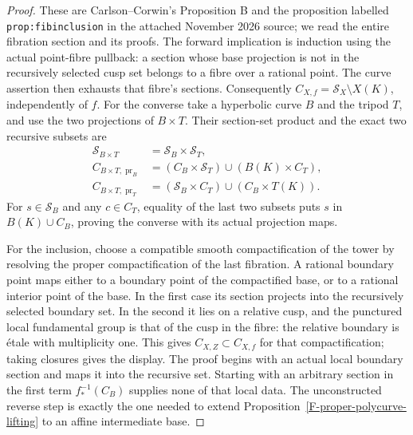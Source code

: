 \begin{proof}
These are Carlson--Corwin's Proposition B and the proposition
labelled \texttt{prop:fibinclusion} in the attached November
2026 source\cite{F-CarlsonCorwin}; we read the entire
fibration section and its proofs. The forward implication is
induction using the actual point-fibre pullback: a section
whose base projection is not in the recursively selected cusp
set belongs to a fibre over a rational point. The curve
assertion then exhausts that fibre's sections. Consequently
$C_{X,f}=\mathcal S_X\setminus X(K)$, independently of $f$.
For the converse take a hyperbolic curve $B$ and the tripod
$T$, and use the two projections of $B\times T$. Their
section-set product and the exact two recursive subsets are
\[
\begin{split}
 \mathcal S_{B\times T}&=\mathcal S_B\times\mathcal S_T,\\
 C_{B\times T,\operatorname{pr}_B}
   &=(C_B\times\mathcal S_T)\cup(B(K)\times C_T),\\
 C_{B\times T,\operatorname{pr}_T}
   &=(\mathcal S_B\times C_T)\cup(C_B\times T(K)).
\end{split}
\]
For $s\in\mathcal S_B$ and any $c\in C_T$, equality of the
last two subsets puts $s$ in $B(K)\cup C_B$, proving the
converse with its actual projection maps.

For the inclusion, choose a compatible smooth compactification
of the tower by resolving the proper compactification of the
last fibration. A rational boundary point maps either to a
boundary point of the compactified base, or to a rational
interior point of the base. In the first case its section
projects into the recursively selected boundary set. In the
second it lies on a relative cusp, and the punctured local
fundamental group is that of the cusp in the fibre: the
relative boundary is \'etale with multiplicity one. This
gives $C_{X,Z}\subset C_{X,f}$ for that compactification;
taking closures gives the display. The proof begins with an
actual local boundary section and maps it into the recursive
set. Starting with an arbitrary section in the first term
$f_*^{-1}(C_B)$ supplies none of that local data. The
unconstructed reverse step is exactly the one needed to
extend Proposition~\ref{F-proper-polycurve-lifting} to an
affine intermediate base.
\end{proof}

